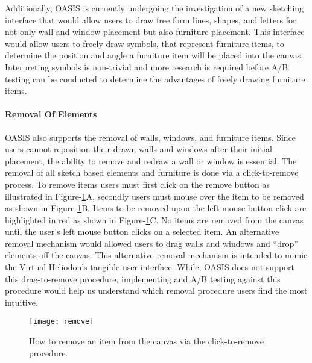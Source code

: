 Additionally, OASIS is currently undergoing the investigation of a new sketching interface that would allow users to draw free form lines, shapes, and letters for not only wall and window placement but also furniture placement.  This interface would allow users to freely draw symbols, that represent furniture items, to determine the position and angle a furniture item will be placed into the canvas.  Interpreting symbols is non-trivial and more research is required before A/B testing can be conducted to determine the advantages of freely drawing furniture items.\\ 

\paragraph{Removal Of Elements}
OASIS also supports the removal of walls, windows, and furniture items.  Since users cannot reposition their drawn walls and windows after their initial placement, the ability to remove and redraw a wall or window is essential.  The removal of all sketch based elements and furniture is done via a click-to-remove process.  To remove items users must first click on the remove button as illustrated in Figure-\ref{fig:remove}A, secondly users must mouse over the item to be removed as shown in Figure-\ref{fig:remove}B.  Items to be removed upon the left mouse button click are highlighted in red as shown in Figure-\ref{fig:remove}C.  No items are removed from the canvas until the user's left mouse button clicks on a selected item.  An alternative removal mechanism would allowed users to drag walls and windows and ``drop'' elements off the canvas.  This alternative removal mechanism is intended to mimic the Virtual Heliodon's tangible user interface.  While, OASIS does not support this drag-to-remove procedure,  implementing and A/B testing against this procedure would help us understand which removal procedure users find the most intuitive.\\ 

\begin{figure}[!ht]
\centering
\texttt{[image: remove]}
\caption{How to remove an item from the canvas via the click-to-remove procedure. 
}
\label{fig:remove}
\end{figure}

